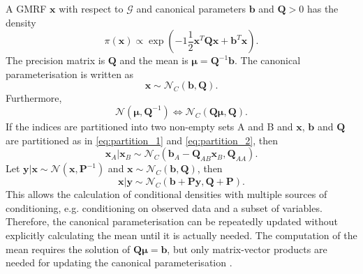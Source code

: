 A GMRF $\pmb{x}$ with respect to $\mathcal{G}$ and canonical parameters $\pmb{b}$ and $\pmb{Q}>0$ has the density
\begin{equation*}
    \pi\left(\pmb{x}\right)\propto\exp\left(-1\frac{1}{2}\pmb{x}^T\pmb{Q}\pmb{x}+\pmb{b}^T\pmb{x}\right).
\end{equation*}
The precision matrix is $\pmb{Q}$ and the mean is $\pmb{\mu}=\pmb{Q}^{-1}\pmb{b}$. The canonical parameterisation is written as 
\begin{equation*}
    \pmb{x}\sim \mathcal{N}_C\left(\pmb{b},\pmb{Q}\right).
\end{equation*}
Furthermore,
\begin{equation*}
    \mathcal{N}\left(\pmb{\mu},\pmb{Q}^{-1}\right) \Longleftrightarrow \mathcal{N}_C\left(\pmb{Q\mu}, \pmb{Q}\right).
\end{equation*}
If the indices are partitioned into two non-empty sets A and B and $\pmb{x}$, $\pmb{b}$ and $\pmb{Q}$ are partitioned as in \eqref{eq:partition_1} and \eqref{eq:partition_2}, then
\begin{equation}
    \pmb{x}_A|\pmb{x}_B\sim\mathcal{N}_C\left(\pmb{b}_A-\pmb{Q}_{AB}\pmb{x}_B,\pmb{Q}_{AA}\right).
\end{equation}
Let $\pmb{y}|\pmb{x}\sim\mathcal{N}\left(\pmb{x},\pmb{P}^{-1}\right)$ and $\pmb{x}\sim\mathcal{N}_C\left(\pmb{b},\pmb{Q}\right)$, then
\begin{equation}
    \pmb{x}|\pmb{y}\sim\mathcal{N}_C\left(\pmb{b}+\pmb{Py}, \pmb{Q}+\pmb{P}\right).
\end{equation}
This allows the calculation of conditional densities with multiple sources of conditioning, e.g. conditioning on observed data and a subset of variables. Therefore, the canonical parameterisation can be repeatedly updated without explicitly calculating the mean until it is actually needed. The computation of the mean requires the solution of $\pmb{Q\mu}=\pmb{b}$, but only matrix-vector products are needed for updating the canonical parameterisation \autocite[][25--27]{rue2005gaussian}.
